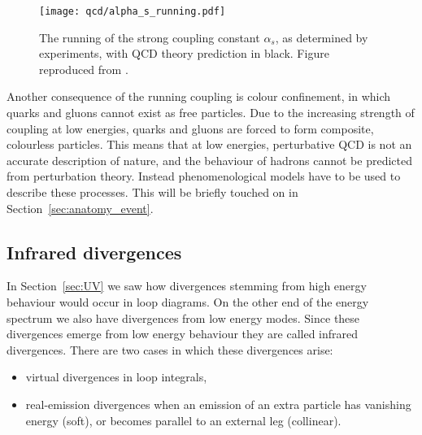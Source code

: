 \documentclass[main.tex]{subfiles}
\begin{document}
    \begin{figure}
        \texttt{[image: qcd/alpha\_s\_running.pdf]}
        \caption{The running of the strong coupling constant $\alpha_{s}$,
        as determined by experiments, with QCD theory prediction in black.
        Figure reproduced from \cite{Workman:2022ynf}.}
        \label{fig:alpha_s_running}
    \end{figure}

    Another consequence of the running coupling
    is colour confinement, in which quarks and
    gluons cannot exist as free particles. Due
    to the increasing strength of coupling at low
    energies, quarks and gluons are forced to
    form composite, colourless particles. This means
    that at low energies, perturbative QCD
    is not an accurate description of nature,
    and the behaviour of hadrons cannot be predicted
    from perturbation theory. Instead phenomenological
    models have to be used to describe these processes.
    This will be briefly touched on in Section~\ref{sec:anatomy_event}.
    
\subsection{Infrared divergences}\label{sec:IR_divergences}
    In Section~\ref{sec:UV} we saw how divergences
    stemming from high energy behaviour would occur
    in loop diagrams. On the other end of the energy
    spectrum we also have divergences from low energy
    modes. Since these divergences emerge from low energy
    behaviour they are called infrared divergences. There
    are two cases in which these divergences arise:
    \begin{itemize}
        \item virtual divergences in loop integrals,
        \item real-emission divergences when an emission
    of an extra particle has vanishing energy (soft),
    or becomes parallel to an external leg (collinear).
    \end{itemize}
\end{document}
